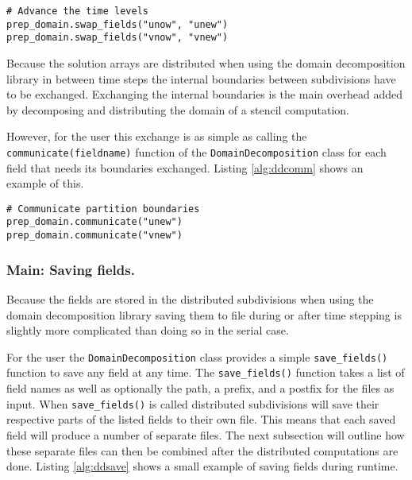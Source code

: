 \begin{lstlisting}[caption={Example swapping two arrays in the domain decomposition libarary},captionpos=b, label={alg:ddswap}, float, floatplacement=H]
# Advance the time levels
prep_domain.swap_fields("unow", "unew")
prep_domain.swap_fields("vnow", "vnew")
\end{lstlisting}

Because the solution arrays are distributed when using the domain decomposition library in between time steps the internal boundaries between subdivisions have to be exchanged.
Exchanging the internal boundaries is the main overhead added by decomposing and distributing the domain of a stencil computation.

However, for the user this exchange is as simple as calling the \texttt{communicate(fieldname)} function of the \texttt{DomainDecomposition} class for each field that needs its boundaries exchanged.
Listing \ref{alg:ddcomm} shows an example of this.

\begin{lstlisting}[caption={Example calling for internal boundary exchange of two fields in the domain decomposition libarary},captionpos=b, label={alg:ddcomm}, float, floatplacement=H]
# Communicate partition boundaries
prep_domain.communicate("unew")
prep_domain.communicate("vnew")
\end{lstlisting}

\subsubsection{Main: Saving fields.}
Because the fields are stored in the distributed subdivisions when using the domain decomposition library saving them to file during or after time stepping is slightly more complicated than doing so in the serial case.

For the user the \texttt{DomainDecomposition} class provides a simple \texttt{save\_fields()} function to save any field at any time.
The \texttt{save\_fields()} function takes a list of field names as well as optionally the path, a prefix, and a postfix for the files as input.
When \texttt{save\_fields()} is called distributed subdivisions will save their respective parts of the listed fields to their own file.
This means that each saved field will produce a number of separate files.
The next subsection will outline how these separate files can then be combined after the distributed computations are done.
Listing \ref{alg:ddsave} shows a small example of saving fields during runtime.

